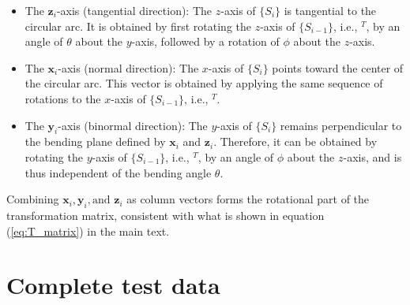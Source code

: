 \documentclass[conference]{IEEEtran}
\begin{document}
\begin{itemize}
    \item 
    The $\mathbf{z}_i$-axis (tangential direction): The $z$-axis of $\{S_i\}$ is tangential to the circular arc. It is obtained by first rotating the $z$-axis of $\{S_{i-1}\}$, i.e., $^T$, by an angle of $\theta$ about the $y$-axis, followed by a rotation of $\phi$ about the $z$-axis.
    \item 
    The $\mathbf{x}_i$-axis (normal direction): The $x$-axis of $\{S_i\}$ points toward the center of the circular arc. This vector is obtained by applying the same sequence of rotations to the $x$-axis of $\{S_{i-1}\}$, i.e., $^T$.
    \item 
    The $\mathbf{y}_i$-axis (binormal direction): The $y$-axis of $\{S_i\}$ remains perpendicular to the bending plane defined by $\mathbf{x}_i$ and $\mathbf{z}_i$. Therefore, it can be obtained by rotating the $y$-axis of $\{S_{i-1}\}$, i.e., $^T$, by an angle of $\phi$ about the $z$-axis, and is thus independent of the bending angle $\theta$.
\end{itemize}

Combining $\mathbf{x}_i, \mathbf{y}_i, \text{and } \mathbf{z}_i$ as column vectors forms the rotational part of the transformation matrix, consistent with what is shown in equation (\ref{eq:T_matrix}) in the main text.

\clearpage

\section{Complete test data}
\end{document}
